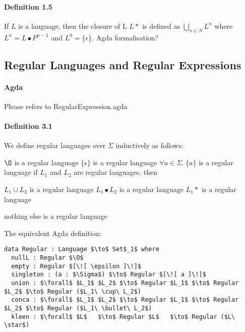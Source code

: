\documentclass[twoside,openright,final]{bhamthesis}
\renewcommand{\item}{\itemindent0.5cm\itemold}
\begin{document}
\paragraph{Definition 1.5} If \(L\) is a language, then the closure of
L \(L\ast\) is defined as \( \bigcup_{n \in N} L^n \) where
\( L^n = L\bullet P^{n - 1} \) and \(L^0 = \{\epsilon\}\). Agda formalisation?

\subsection{Regular Languages and Regular Expressions}
\paragraph{Agda} Please refers to RegularExpression.agda

\paragraph{Definition 3.1} We define regular languages over
\(\Sigma\) inductively as follows:
\begin{enumerate}
  \item \(\O\) is a regular language
  \item \(\{\epsilon\}\) is a regular language
  \item \(\forall a\in\Sigma.\ \{a\}\) is a regular language
  \item if \(L_1\) and \(L_2\) are regular languages, then
    \begin{enumerate}
      \item \(L_1\cup L_2\) is a regular language
      \item \(L_1\bullet L_2\) is a regular language
      \item \(L_1\ast\) is a regular language
    \end{enumerate}
  \item nothing else is a regular language
\end{enumerate}
The equivalent Agda definition: 
\begin{lstlisting}[mathescape=true,aboveskip=0pt,belowskip=0pt]
data Regular : Language $\to$ Set$_1$ where
  nullL : Regular $\O$
  empty : Regular $[\![ \epsilon ]\!]$
  singleton : (a : $\Sigma$) $\to$ Regular $[\![ a ]\!]$
  union : $\forall$ $L_1$ $L_2$ $\to$ Regular $L_1$ $\to$ Regular $L_2$ $\to$ Regular ($L_1\ \cup\ L_2$)
  conca : $\forall$ $L_1$ $L_2$ $\to$ Regular $L_1$ $\to$ Regular $L_2$ $\to$ Regular ($L_1\ \bullet\ L_2$) 
  kleen : $\forall$ $L$   $\to$ Regular $L$   $\to$ Regular ($L\ \star$)
\end{lstlisting}
\end{document}
